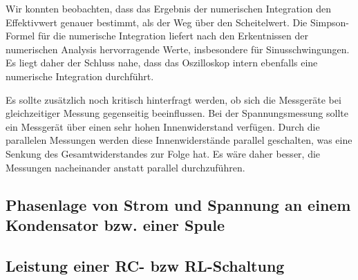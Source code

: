 \documentclass{article}
\begin{document}
Wir konnten beobachten, dass das Ergebnis der numerischen Integration den Effektivwert genauer bestimmt, als der Weg über den Scheitelwert. Die Simpson-Formel für die numerische Integration liefert nach den Erkentnissen der numerischen Analysis hervorragende Werte, insbesondere für Sinusschwingungen. Es liegt daher der Schluss nahe, dass das Oszilloskop intern ebenfalls eine numerische Integration durchführt.

Es sollte zusätzlich noch kritisch hinterfragt werden, ob sich die Messgeräte bei gleichzeitiger Messung gegenseitig beeinflussen. Bei der Spannungsmessung sollte ein Messgerät über einen sehr hohen Innenwiderstand verfügen. Durch die parallelen Messungen werden diese Innenwiderstände parallel geschalten, was eine Senkung des Gesamtwiderstandes zur Folge hat. Es wäre daher besser, die Messungen nacheinander anstatt parallel durchzuführen.


\subsection{Phasenlage von Strom und Spannung an einem Kondensator bzw. einer Spule}

%
%


\subsection{Leistung einer RC- bzw RL-Schaltung}
\end{document}
